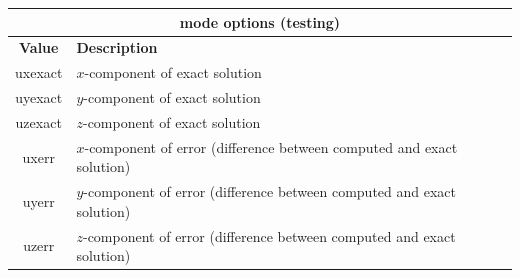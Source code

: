 \documentclass[11pt]{report}
\begin{document}
\begin{center}
\begin{tabular}{|c|l|} \hline
\multicolumn{2}{|c|}{\bf mode options (testing)}\\ \hline
\bf{Value} & \bf{Description} \\ 
\hline  \hline
uxexact & $x$-component of exact solution\\ \hline
uyexact & $y$-component of exact solution\\ \hline
uzexact & $z$-component of exact solution\\ \hline
uxerr   & $x$-component of error (difference between computed and exact solution)\\ \hline
uyerr   & $y$-component of error (difference between computed and exact solution)\\ \hline
uzerr   & $z$-component of error (difference between computed and exact solution)\\ \hline
\end{tabular}
\end{center}

\end{document}
